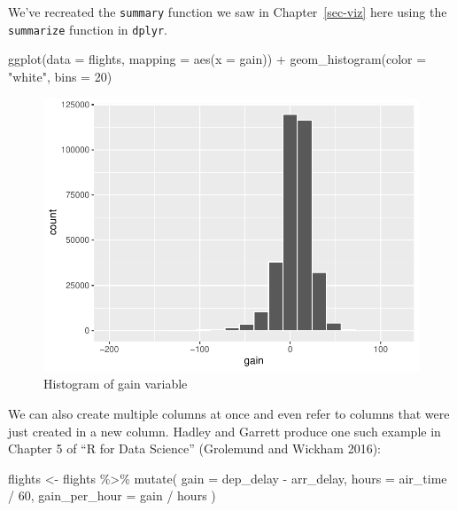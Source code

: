 \documentclass[
  letterpaper,
  DIV=11,
  numbers=noendperiod]{scrreprt}
\newenvironment{Shaded}{\begin{snugshade}}{\end{snugshade}}
\newcommand{\AttributeTok}[1]{\textcolor[rgb]{0.40,0.45,0.13}{#1}}
\newcommand{\DecValTok}[1]{\textcolor[rgb]{0.68,0.00,0.00}{#1}}
\newcommand{\FunctionTok}[1]{\textcolor[rgb]{0.28,0.35,0.67}{#1}}
\newcommand{\NormalTok}[1]{\textcolor[rgb]{0.00,0.23,0.31}{#1}}
\newcommand{\OtherTok}[1]{\textcolor[rgb]{0.00,0.23,0.31}{#1}}
\newcommand{\SpecialCharTok}[1]{\textcolor[rgb]{0.37,0.37,0.37}{#1}}
\newcommand{\StringTok}[1]{\textcolor[rgb]{0.13,0.47,0.30}{#1}}
\theoremstyle{definition}
\theoremstyle{remark}
\begin{document}
We've recreated the \texttt{summary} function we saw in
Chapter~\ref{sec-viz} here using the \texttt{summarize} function in
\texttt{dplyr}.

\begin{Shaded}
\begin{Highlighting}[]
\FunctionTok{ggplot}\NormalTok{(}\AttributeTok{data =}\NormalTok{ flights, }\AttributeTok{mapping =} \FunctionTok{aes}\NormalTok{(}\AttributeTok{x =}\NormalTok{ gain)) }\SpecialCharTok{+}
  \FunctionTok{geom\_histogram}\NormalTok{(}\AttributeTok{color =} \StringTok{"white"}\NormalTok{, }\AttributeTok{bins =} \DecValTok{20}\NormalTok{)}
\end{Highlighting}
\end{Shaded}

\begin{figure}[H]

{\centering \includegraphics{03-wrangling_files/figure-pdf/fig-hist-gain-variable-1.pdf}

}

\caption{\label{fig-hist-gain-variable}Histogram of gain variable}

\end{figure}

We can also create multiple columns at once and even refer to columns
that were just created in a new column. Hadley and Garrett produce one
such example in Chapter 5 of ``R for Data Science'' (Grolemund and
Wickham 2016):

\begin{Shaded}
\begin{Highlighting}[]
\NormalTok{flights }\OtherTok{\textless{}{-}}\NormalTok{ flights }\SpecialCharTok{\%\textgreater{}\%} 
  \FunctionTok{mutate}\NormalTok{(}
    \AttributeTok{gain =}\NormalTok{ dep\_delay }\SpecialCharTok{{-}}\NormalTok{ arr\_delay,}
    \AttributeTok{hours =}\NormalTok{ air\_time }\SpecialCharTok{/} \DecValTok{60}\NormalTok{,}
    \AttributeTok{gain\_per\_hour =}\NormalTok{ gain }\SpecialCharTok{/}\NormalTok{ hours}
\NormalTok{  )}
\end{Highlighting}
\end{Shaded}
\end{document}
